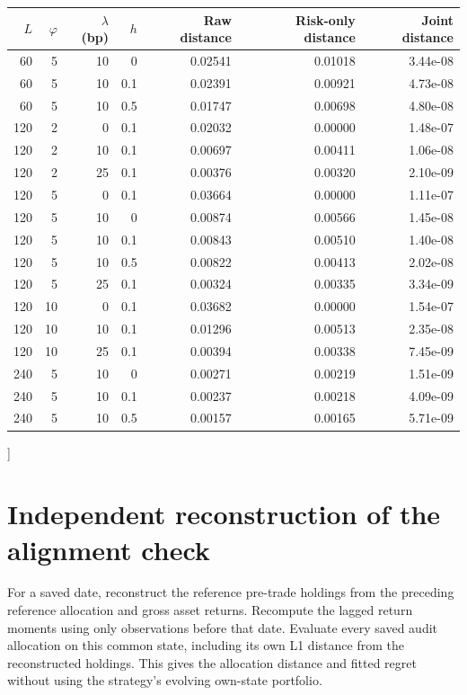 \documentclass[sigconf,review]{acmart}
\begin{document}
{\begin{center}
\label{tab:fullrobust}
\begin{tabular}{rrrrrrr}\toprule
$L$ & $\varphi$ & $\lambda$ (bp) & $h$ & Raw distance & Risk-only distance & Joint distance\\\midrule
60 & 5 & 10 & 0 & 0.02541 & 0.01018 & 3.44e-08 \\
60 & 5 & 10 & 0.1 & 0.02391 & 0.00921 & 4.73e-08 \\
60 & 5 & 10 & 0.5 & 0.01747 & 0.00698 & 4.80e-08 \\
120 & 2 & 0 & 0.1 & 0.02032 & 0.00000 & 1.48e-07 \\
120 & 2 & 10 & 0.1 & 0.00697 & 0.00411 & 1.06e-08 \\
120 & 2 & 25 & 0.1 & 0.00376 & 0.00320 & 2.10e-09 \\
120 & 5 & 0 & 0.1 & 0.03664 & 0.00000 & 1.11e-07 \\
120 & 5 & 10 & 0 & 0.00874 & 0.00566 & 1.45e-08 \\
120 & 5 & 10 & 0.1 & 0.00843 & 0.00510 & 1.40e-08 \\
120 & 5 & 10 & 0.5 & 0.00822 & 0.00413 & 2.02e-08 \\
120 & 5 & 25 & 0.1 & 0.00324 & 0.00335 & 3.34e-09 \\
120 & 10 & 0 & 0.1 & 0.03682 & 0.00000 & 1.54e-07 \\
120 & 10 & 10 & 0.1 & 0.01296 & 0.00513 & 2.35e-08 \\
120 & 10 & 25 & 0.1 & 0.00394 & 0.00338 & 7.45e-09 \\
240 & 5 & 10 & 0 & 0.00271 & 0.00219 & 1.51e-09 \\
240 & 5 & 10 & 0.1 & 0.00237 & 0.00218 & 4.09e-09 \\
240 & 5 & 10 & 0.5 & 0.00157 & 0.00165 & 5.71e-09 \\
\bottomrule\end{tabular}
\end{center}
}]

\section{Independent reconstruction of the alignment check}\label{app:verification}
For a saved date, reconstruct the reference pre-trade holdings from the preceding reference allocation and gross asset returns. Recompute the lagged return moments using only observations before that date. Evaluate every saved audit allocation on this common state, including its own L1 distance from the reconstructed holdings. This gives the allocation distance and fitted regret without using the strategy's evolving own-state portfolio.
\end{document}
